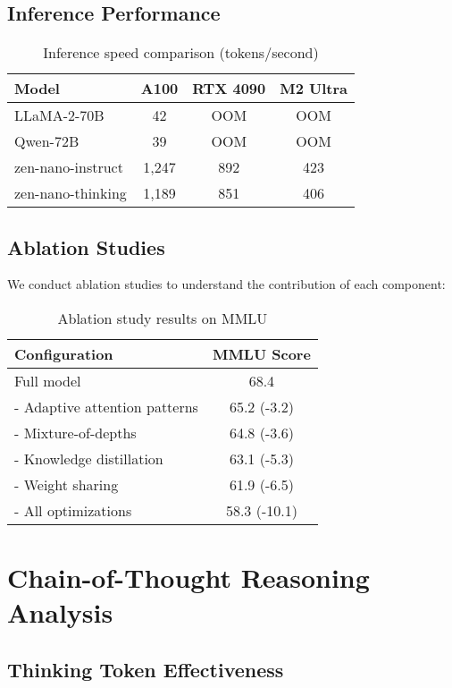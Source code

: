\documentclass[11pt,a4paper]{article}
\begin{document}
\subsection{Inference Performance}

\begin{table}[h]
\centering
\caption{Inference speed comparison (tokens/second)}
\begin{tabular}{lccc}
\toprule
Model & A100 & RTX 4090 & M2 Ultra \\
\midrule
LLaMA-2-70B & 42 & OOM & OOM \\
Qwen-72B & 39 & OOM & OOM \\
\midrule
zen-nano-instruct & 1,247 & 892 & 423 \\
zen-nano-thinking & 1,189 & 851 & 406 \\
\bottomrule
\end{tabular}
\end{table}

\subsection{Ablation Studies}

We conduct ablation studies to understand the contribution of each component:

\begin{table}[h]
\centering
\caption{Ablation study results on MMLU}
\begin{tabular}{lc}
\toprule
Configuration & MMLU Score \\
\midrule
Full model & 68.4 \\
- Adaptive attention patterns & 65.2 (-3.2) \\
- Mixture-of-depths & 64.8 (-3.6) \\
- Knowledge distillation & 63.1 (-5.3) \\
- Weight sharing & 61.9 (-6.5) \\
- All optimizations & 58.3 (-10.1) \\
\bottomrule
\end{tabular}
\end{table}

\section{Chain-of-Thought Reasoning Analysis}

\subsection{Thinking Token Effectiveness}
\end{document}
